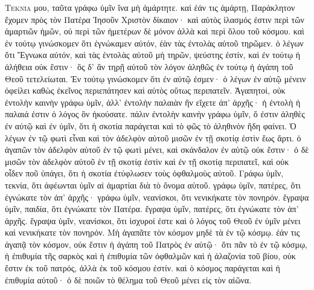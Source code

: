 \begin{pages}
    \begin{Rightside}
        \beginnumbering
		\renewcommand{\LettrineFontHook}{\PHtitl}
		\lettrine[lines=3]{Τ}{εκνία} μου, ταῦτα γράφω ὑμῖν ἵνα μὴ ἁμάρτητε. καὶ ἐάν τις ἁμάρτῃ, Παράκλητον ἔχομεν πρὸς τὸν Πατέρα Ἰησοῦν Χριστὸν δίκαιον· καὶ αὐτὸς ἱλασμός ἐστιν περὶ τῶν ἁμαρτιῶν ἡμῶν, οὐ περὶ τῶν ἡμετέρων δὲ μόνον ἀλλὰ καὶ περὶ ὅλου τοῦ κόσμου. καὶ ἐν τούτῳ γινώσκομεν ὅτι ἐγνώκαμεν αὐτόν, ἐὰν τὰς ἐντολὰς αὐτοῦ τηρῶμεν. ὁ λέγων ὅτι Ἔγνωκα αὐτόν, καὶ τὰς ἐντολὰς αὐτοῦ μὴ τηρῶν, ψεύστης ἐστίν, καὶ ἐν τούτῳ ἡ ἀλήθεια οὐκ ἔστιν· ὃς δ’ ἂν τηρῇ αὐτοῦ τὸν λόγον ἀληθῶς ἐν τούτῳ ἡ ἀγάπη τοῦ Θεοῦ τετελείωται. Ἐν τούτῳ γινώσκομεν ὅτι ἐν αὐτῷ ἐσμεν· ὁ λέγων ἐν αὐτῷ μένειν ὀφείλει καθὼς ἐκεῖνος περιεπάτησεν καὶ αὐτὸς οὕτως περιπατεῖν.
		\pend
		\pstart
		Ἀγαπητοί, οὐκ ἐντολὴν καινὴν γράφω ὑμῖν, ἀλλ’ ἐντολὴν παλαιὰν ἣν εἴχετε ἀπ’ ἀρχῆς· ἡ ἐντολὴ ἡ παλαιά ἐστιν ὁ λόγος ὃν ἠκούσατε. πάλιν ἐντολὴν καινὴν γράφω ὑμῖν, ὅ ἐστιν ἀληθὲς ἐν αὐτῷ καὶ ἐν ὑμῖν, ὅτι ἡ σκοτία παράγεται καὶ τὸ φῶς τὸ ἀληθινὸν ἤδη φαίνει. Ὁ λέγων ἐν τῷ φωτὶ εἶναι καὶ τὸν ἀδελφὸν αὐτοῦ μισῶν ἐν τῇ σκοτίᾳ ἐστὶν ἕως ἄρτι. ὁ ἀγαπῶν τὸν ἀδελφὸν αὐτοῦ ἐν τῷ φωτὶ μένει, καὶ σκάνδαλον ἐν αὐτῷ οὐκ ἔστιν· ὁ δὲ μισῶν τὸν ἀδελφὸν αὐτοῦ ἐν τῇ σκοτίᾳ ἐστὶν καὶ ἐν τῇ σκοτίᾳ περιπατεῖ, καὶ οὐκ οἶδεν ποῦ ὑπάγει, ὅτι ἡ σκοτία ἐτύφλωσεν τοὺς ὀφθαλμοὺς αὐτοῦ. Γράφω ὑμῖν, τεκνία, ὅτι ἀφέωνται ὑμῖν αἱ ἁμαρτίαι διὰ τὸ ὄνομα αὐτοῦ. γράφω ὑμῖν, πατέρες, ὅτι ἐγνώκατε τὸν ἀπ’ ἀρχῆς· γράφω ὑμῖν, νεανίσκοι, ὅτι νενικήκατε τὸν πονηρόν. ἔγραψα ὑμῖν, παιδία, ὅτι ἐγνώκατε τὸν Πατέρα. ἔγραψα ὑμῖν, πατέρες, ὅτι ἐγνώκατε τὸν ἀπ’ ἀρχῆς. ἔγραψα ὑμῖν, νεανίσκοι, ὅτι ἰσχυροί ἐστε καὶ ὁ λόγος τοῦ Θεοῦ ἐν ὑμῖν μένει καὶ νενικήκατε τὸν πονηρόν. Μὴ ἀγαπᾶτε τὸν κόσμον μηδὲ τὰ ἐν τῷ κόσμῳ. ἐάν τις ἀγαπᾷ τὸν κόσμον, οὐκ ἔστιν ἡ ἀγάπη τοῦ Πατρὸς ἐν αὐτῷ· ὅτι πᾶν τὸ ἐν τῷ κόσμῳ, ἡ ἐπιθυμία τῆς σαρκὸς καὶ ἡ ἐπιθυμία τῶν ὀφθαλμῶν καὶ ἡ ἀλαζονία τοῦ βίου, οὐκ ἔστιν ἐκ τοῦ πατρός, ἀλλὰ ἐκ τοῦ κόσμου ἐστίν. καὶ ὁ κόσμος παράγεται καὶ ἡ ἐπιθυμία αὐτοῦ· ὁ δὲ ποιῶν τὸ θέλημα τοῦ Θεοῦ μένει εἰς τὸν αἰῶνα.
		\pend
		\pstart

\end{Rightside}
\end{pages}
